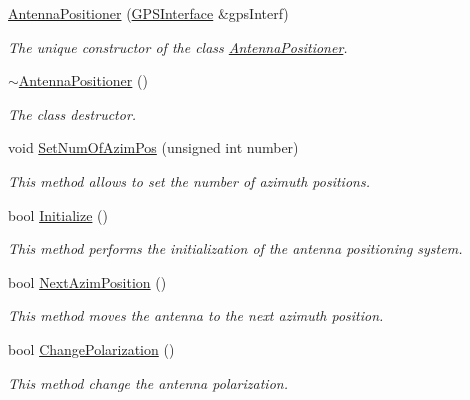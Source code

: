 \begin{DoxyCompactItemize}
\item 
\hyperlink{classAntennaPositioner_ad7e864f6073421c98585c64802a3e78e}{Antenna\+Positioner} (\hyperlink{classGPSInterface}{G\+P\+S\+Interface} \&gps\+Interf)
\begin{DoxyCompactList}\small\item\em The unique constructor of the class {\itshape \hyperlink{classAntennaPositioner}{Antenna\+Positioner}}. \end{DoxyCompactList}\item 
\hyperlink{classAntennaPositioner_a7a3a48b1aab43b9a43b664567a8c5829}{$\sim$\+Antenna\+Positioner} ()
\begin{DoxyCompactList}\small\item\em The class destructor. \end{DoxyCompactList}\item 
\mbox{\label{classAntennaPositioner_a0c9f91b2ad5d5cc3e23312a395d0abda}} 
void \hyperlink{classAntennaPositioner_a0c9f91b2ad5d5cc3e23312a395d0abda}{Set\+Num\+Of\+Azim\+Pos} (unsigned int number)
\begin{DoxyCompactList}\small\item\em This method allows to set the number of azimuth positions. \end{DoxyCompactList}\item 
bool \hyperlink{classAntennaPositioner_a5087caa452709b33082c41b2cef2a23e}{Initialize} ()
\begin{DoxyCompactList}\small\item\em This method performs the initialization of the antenna positioning system. \end{DoxyCompactList}\item 
bool \hyperlink{classAntennaPositioner_a2e05c385b9933d2ee1d4f8f953c99070}{Next\+Azim\+Position} ()
\begin{DoxyCompactList}\small\item\em This method moves the antenna to the next azimuth position. \end{DoxyCompactList}\item 
bool \hyperlink{classAntennaPositioner_a0e4f58f67280f2a6daa10c7cc02f0abd}{Change\+Polarization} ()
\begin{DoxyCompactList}\small\item\em This method change the antenna polarization. \end{DoxyCompactList}\item 

\end{DoxyCompactItemize}
